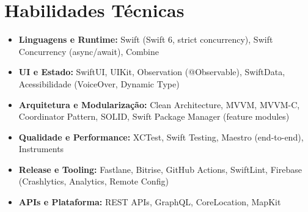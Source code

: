 \documentclass[11pt,letterpaper]{article}
\begin{document}
\section*{Habilidades Técnicas}

\begin{itemize}[leftmargin=0.15in]
    \item \textbf{Linguagens e Runtime:} Swift (Swift 6, strict concurrency), Swift Concurrency (async/await), Combine
    \item \textbf{UI e Estado:} SwiftUI, UIKit, Observation (@Observable), SwiftData, Acessibilidade (VoiceOver, Dynamic Type)
    \item \textbf{Arquitetura e Modularização:} Clean Architecture, MVVM, MVVM-C, Coordinator Pattern, SOLID, Swift Package Manager (feature modules)
    \item \textbf{Qualidade e Performance:} XCTest, Swift Testing, Maestro (end-to-end), Instruments
    \item \textbf{Release e Tooling:} Fastlane, Bitrise, GitHub Actions, SwiftLint, Firebase (Crashlytics, Analytics, Remote Config)
    \item \textbf{APIs e Plataforma:} REST APIs, GraphQL, CoreLocation, MapKit
\end{itemize}
\end{document}
